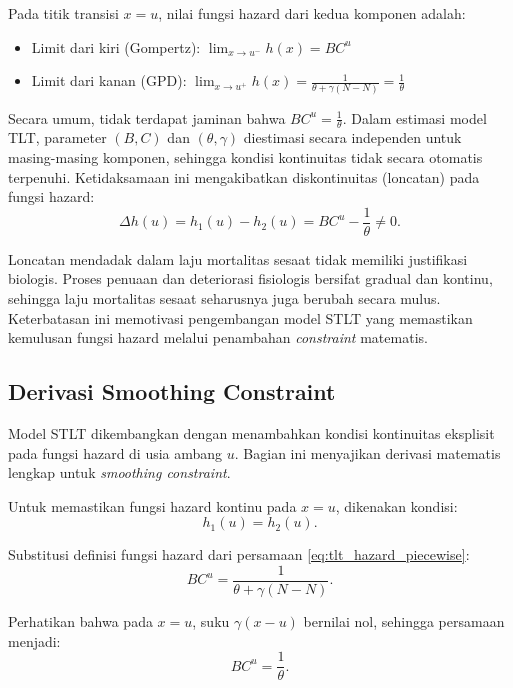 Pada titik transisi $x = u$, nilai fungsi hazard dari kedua komponen adalah:
\begin{itemize}
    \item Limit dari kiri (Gompertz): $\lim_{x \to u^-} h(x) = BC^u$
    \item Limit dari kanan (GPD): $\lim_{x \to u^+} h(x) = \frac{1}{\theta + \gamma(N-N)} = \frac{1}{\theta}$
\end{itemize}

Secara umum, tidak terdapat jaminan bahwa $BC^u = \frac{1}{\theta}$. Dalam estimasi model TLT, parameter $(B, C)$ dan $(\theta, \gamma)$ diestimasi secara independen untuk masing-masing komponen, sehingga kondisi kontinuitas tidak secara otomatis terpenuhi. Ketidaksamaan ini mengakibatkan diskontinuitas (loncatan) pada fungsi hazard:
\begin{equation}
\Delta h(u) = h_1(u) - h_2(u) = BC^u - \frac{1}{\theta} \neq 0.
\label{eq:hazard_jump}
\end{equation}



Loncatan mendadak dalam laju mortalitas sesaat tidak memiliki justifikasi biologis. Proses penuaan dan deteriorasi fisiologis bersifat gradual dan kontinu, sehingga laju mortalitas sesaat seharusnya juga berubah secara mulus. Keterbatasan ini memotivasi pengembangan model STLT yang memastikan kemulusan fungsi hazard melalui penambahan \textit{constraint} matematis.

\subsection{Derivasi Smoothing Constraint}

Model STLT dikembangkan dengan menambahkan kondisi kontinuitas eksplisit pada fungsi hazard di usia ambang $u$. Bagian ini menyajikan derivasi matematis lengkap untuk \textit{smoothing constraint}.

Untuk memastikan fungsi hazard kontinu pada $x = u$, dikenakan kondisi:
\begin{equation}
h_1(u) = h_2(u).
\label{eq:smoothing_condition}
\end{equation}

Substitusi definisi fungsi hazard dari persamaan \eqref{eq:tlt_hazard_piecewise}:
\begin{equation}
BC^u = \frac{1}{\theta + \gamma(N-N)}.
\label{eq:smoothing_substitution}
\end{equation}

Perhatikan bahwa pada $x = u$, suku $\gamma(x-u)$ bernilai nol, sehingga persamaan menjadi:
\begin{equation}
BC^u = \frac{1}{\theta}.
\label{eq:smoothing_simplified}
\end{equation}

